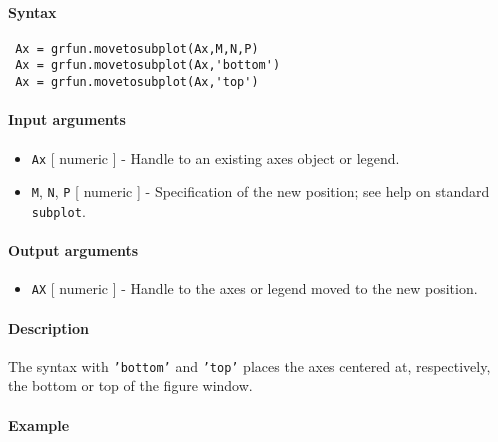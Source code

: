 


	\paragraph{Syntax}
 
 \begin{verbatim}
 Ax = grfun.movetosubplot(Ax,M,N,P)
 Ax = grfun.movetosubplot(Ax,'bottom')
 Ax = grfun.movetosubplot(Ax,'top')
 \end{verbatim}
 
 \paragraph{Input arguments}
 
 \begin{itemize}
 \item
   \texttt{Ax} {[} numeric {]} - Handle to an existing axes object or
   legend.
 \item
   \texttt{M}, \texttt{N}, \texttt{P} {[} numeric {]} - Specification of
   the new position; see help on standard \texttt{subplot}.
 \end{itemize}
 
 \paragraph{Output arguments}
 
 \begin{itemize}
 \item
   \texttt{AX} {[} numeric {]} - Handle to the axes or legend moved to
   the new position.
 \end{itemize}
 
 \paragraph{Description}
 
 The syntax with \texttt{'bottom'} and \texttt{'top'} places the axes
 centered at, respectively, the bottom or top of the figure window.
 
 \paragraph{Example}


